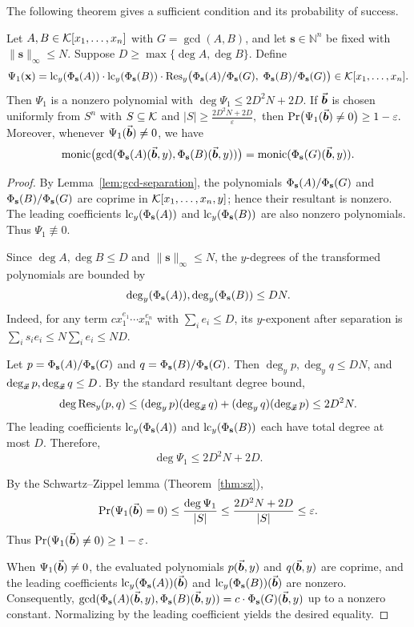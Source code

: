 \documentclass{article}
\numberwithin{equation}{section}
\begin{document}
The following theorem gives a sufficient condition and its probability of success.

\begin{theorem}\label{thm:b-condition1}
Let $A, B \in {\mathcal{K}}[x_1, \dots, x_n]$ with $G = \gcd(A, B)$, and let $\mathbf{s} \in \mathbb{N}^n$ be fixed with $\|\mathbf{s}\|_\infty \le N$. Suppose $D \ge \max\{\deg A, \deg B\}$. Define
\[
\Psi_1(\mathbf{x}) = \operatorname{lc}_y(\Phi_{\mathbf{s}}(A)) \cdot \operatorname{lc}_y(\Phi_{\mathbf{s}}(B)) \cdot \operatorname{Res}_y\bigl( \Phi_{\mathbf{s}}(A)/\Phi_{\mathbf{s}}(G),\; \Phi_{\mathbf{s}}(B)/\Phi_{\mathbf{s}}(G) \bigr) \in {\mathcal{K}}[x_1, \dots, x_n].
\]
Then $\Psi_1$ is a nonzero polynomial with
%
$\deg \Psi_1 \le 2D^2 N + 2D.$
%
If $\vec{\boldsymbol{b}}$ is chosen uniformly from $S^n$ with $S \subseteq {\mathcal{K}}$ and
%
$|S| \ge \frac{2D^2 N + 2D}{\varepsilon},$
%
then
%
$\Pr\bigl( \Psi_1(\vec{\boldsymbol{b}}) \neq 0 \bigr) \ge 1 - \varepsilon.$
%
Moreover, whenever $\Psi_1(\vec{\boldsymbol{b}}) \neq 0$, we have
\[
\operatorname{monic}\bigl( \gcd( \Phi_{\mathbf{s}}(A)(\vec{\boldsymbol{b}}, y), \Phi_{\mathbf{s}}(B)(\vec{\boldsymbol{b}}, y) ) \bigr) = \operatorname{monic}(\Phi_{\mathbf{s}}(G)(\vec{\boldsymbol{b}}, y)).
\]
\end{theorem}

\begin{proof}
By Lemma~\ref{lem:gcd-separation}, the polynomials $\Phi_{\mathbf{s}}(A)/\Phi_{\mathbf{s}}(G)$ and $\Phi_{\mathbf{s}}(B)/\Phi_{\mathbf{s}}(G)$ are coprime in ${\mathcal{K}}[x_1, \dots, x_n, y]$; hence their resultant is nonzero. The leading coefficients $\operatorname{lc}_y(\Phi_{\mathbf{s}}(A))$ and $\operatorname{lc}_y(\Phi_{\mathbf{s}}(B))$ are also nonzero polynomials. Thus $\Psi_1 \not\equiv 0$.

Since $\deg A, \deg B \le D$ and $\|\mathbf{s}\|_\infty \le N$, the $y$-degrees of the transformed polynomials are bounded by
\[
\deg_y(\Phi_{\mathbf{s}}(A)), \deg_y(\Phi_{\mathbf{s}}(B)) \le D N.
\]
Indeed, for any term $c x_1^{e_1}\cdots x_n^{e_n}$ with $\sum_i e_i \le D$, its $y$-exponent after separation is $\sum_i s_i e_i \le N \sum_i e_i \le N D$.

Let $p = \Phi_{\mathbf{s}}(A)/\Phi_{\mathbf{s}}(G)$ and $q = \Phi_{\mathbf{s}}(B)/\Phi_{\mathbf{s}}(G)$. Then $\deg_y p, \deg_y q \le D N$, and $\deg_{\vec{\boldsymbol{x}}} p, \deg_{\vec{\boldsymbol{x}}} q \le D$. By the standard resultant degree bound,
\[
\deg \operatorname{Res}_y(p, q)
\le (\deg_y p)(\deg_{\vec{\boldsymbol{x}}} q) + (\deg_y q)(\deg_{\vec{\boldsymbol{x}}} p)
\le 2D^2 N.
\]
The leading coefficients $\operatorname{lc}_y(\Phi_{\mathbf{s}}(A))$ and $\operatorname{lc}_y(\Phi_{\mathbf{s}}(B))$ each have total degree at most $D$. Therefore,
\[
\deg \Psi_1 \le 2D^2 N + 2D.
\]

By the Schwartz--Zippel lemma (Theorem~\ref{thm:sz}),
\[
\Pr(\Psi_1(\vec{\boldsymbol{b}}) = 0) \le \frac{\deg \Psi_1}{|S|}
\le \frac{2D^2 N + 2D}{|S|}
\le \varepsilon.
\]
Thus $\Pr(\Psi_1(\vec{\boldsymbol{b}}) \neq 0) \ge 1 - \varepsilon$.

When $\Psi_1(\vec{\boldsymbol{b}}) \neq 0$, the evaluated polynomials $p(\vec{\boldsymbol{b}}, y)$ and $q(\vec{\boldsymbol{b}}, y)$ are coprime, and the leading coefficients $\operatorname{lc}_y(\Phi_{\mathbf{s}}(A))(\vec{\boldsymbol{b}})$ and $\operatorname{lc}_y(\Phi_{\mathbf{s}}(B))(\vec{\boldsymbol{b}})$ are nonzero. Consequently, $\gcd(\Phi_{\mathbf{s}}(A)(\vec{\boldsymbol{b}}, y), \Phi_{\mathbf{s}}(B)(\vec{\boldsymbol{b}}, y)) =c\cdot \Phi_{\mathbf{s}}(G)(\vec{\boldsymbol{b}}, y)$ up to a nonzero constant. Normalizing by the leading coefficient yields the desired equality.
\end{proof}
\end{document}
